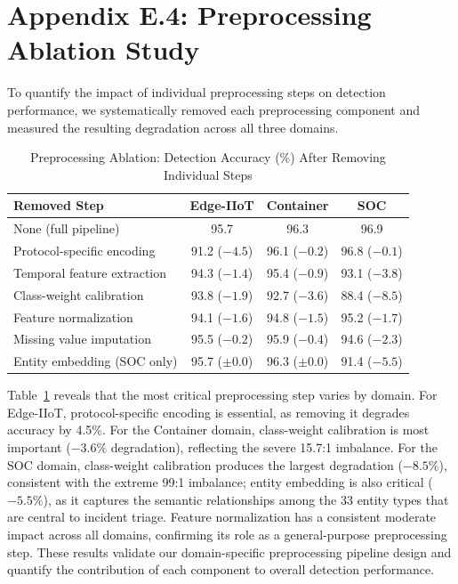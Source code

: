 \documentclass[12pt,a4paper]{article}
\theoremstyle{definition}
\begin{document}
\section{Appendix E.4: Preprocessing Ablation Study}
\label{sec:preprocess_ablation}

To quantify the impact of individual preprocessing steps on detection performance, we systematically removed each preprocessing component and measured the resulting degradation across all three domains.

\begin{table}[H]
\centering
\caption{Preprocessing Ablation: Detection Accuracy (\%) After Removing Individual Steps}
\label{tab:preprocess_ablation}
\small
\begin{tabular}{lccc}
\toprule
\textbf{Removed Step} & \textbf{Edge-IIoT} & \textbf{Container} & \textbf{SOC} \\
\midrule
None (full pipeline) & 95.7 & 96.3 & 96.9 \\
Protocol-specific encoding & 91.2 ($-4.5$) & 96.1 ($-0.2$) & 96.8 ($-0.1$) \\
Temporal feature extraction & 94.3 ($-1.4$) & 95.4 ($-0.9$) & 93.1 ($-3.8$) \\
Class-weight calibration & 93.8 ($-1.9$) & 92.7 ($-3.6$) & 88.4 ($-8.5$) \\
Feature normalization & 94.1 ($-1.6$) & 94.8 ($-1.5$) & 95.2 ($-1.7$) \\
Missing value imputation & 95.5 ($-0.2$) & 95.9 ($-0.4$) & 94.6 ($-2.3$) \\
Entity embedding (SOC only) & 95.7 ($\pm 0.0$) & 96.3 ($\pm 0.0$) & 91.4 ($-5.5$) \\
\bottomrule
\end{tabular}
\end{table}

Table~\ref{tab:preprocess_ablation} reveals that the most critical preprocessing step varies by domain. For Edge-IIoT, protocol-specific encoding is essential, as removing it degrades accuracy by 4.5\%. For the Container domain, class-weight calibration is most important ($-3.6\%$ degradation), reflecting the severe 15.7:1 imbalance. For the SOC domain, class-weight calibration produces the largest degradation ($-8.5\%$), consistent with the extreme 99:1 imbalance; entity embedding is also critical ($-5.5\%$), as it captures the semantic relationships among the 33 entity types that are central to incident triage. Feature normalization has a consistent moderate impact across all domains, confirming its role as a general-purpose preprocessing step. These results validate our domain-specific preprocessing pipeline design and quantify the contribution of each component to overall detection performance.
\end{document}
